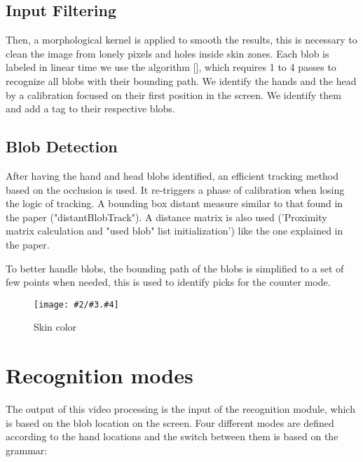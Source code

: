 \documentclass{llncs}
\newcommand\ignore[1]{}
\newcommand{\imagepathext}[5]{%
\begin{figure}[hbtp]
\hfil\texttt{[image: \#2/\#3.\#4]}\hfil
\caption{#5\label{#3}}
\end{figure}}
\newcommand{\png}[2]{\imagepathext{width=\columnwidth}{pics}{#1}{png}{#2}}
\begin{document}
\subsection{Input Filtering}
Then, a morphological kernel is applied to smooth the results, this is necessary to clean the image from lonely pixels and holes inside skin zones.
Each blob is labeled in linear time we use the algorithm [], which requires 1 to 4 passes to recognize all blobs with their bounding path.
We identify the hands and the head by a calibration focused on their first position in the screen. We identify them and add a tag to their respective blobs.

\subsection{Blob Detection}
After having the hand and head blobs identified, an efficient tracking method based on the occlusion is used. It re-triggers a phase of calibration when losing the logic of tracking.
A bounding box distant measure similar to that found in the paper \cite{app06} ("distantBlobTrack"). A distance matrix is also used ('Proximity matrix calculation and "used blob" list initialization') like the one explained in the paper. 
\ignore{
When the matrix of distance is set up, there are some loops:
* A loop for detect inactive tracks: those tracks with no blobs near.
* Detect and create new tracks: those blobs without a track near.
* A loop to assign blobs to tracks. It makes clusters with blobs that are close and assign them to a track. In this step some tracks could merge in one.
* At the end, all inactive tracks are checked to delete the old ones.
}
To better handle blobs, the bounding path of the blobs is simplified to a set of few points when needed, this is used to identify picks for the counter mode.

\png{skincolor}{Skin color}

\ignore{
\section{Simplified gesture generation}
Using these blocks we are able to perturb
}

\section{Recognition modes}
The output of this video processing is the input of the recognition module, which is based on the blob location on the screen. Four different modes are defined according to the hand locations and the switch between them is based on the grammar:
\end{document}
